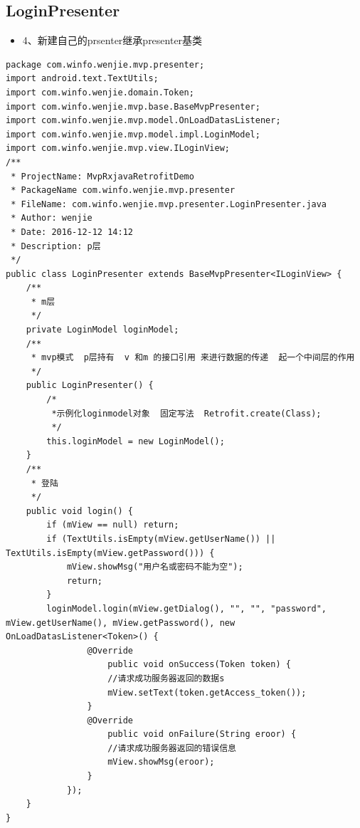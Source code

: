 \documentclass[9pt, b5paper]{article}
\begin{document}
\subsection{LoginPresenter}
\label{sec-21-4}
\begin{itemize}
\item 4、新建自己的prsenter继承presenter基类
\end{itemize}
\begin{verbatim}
package com.winfo.wenjie.mvp.presenter;
import android.text.TextUtils;
import com.winfo.wenjie.domain.Token;
import com.winfo.wenjie.mvp.base.BaseMvpPresenter;
import com.winfo.wenjie.mvp.model.OnLoadDatasListener;
import com.winfo.wenjie.mvp.model.impl.LoginModel;
import com.winfo.wenjie.mvp.view.ILoginView;
/**
 * ProjectName: MvpRxjavaRetrofitDemo
 * PackageName com.winfo.wenjie.mvp.presenter
 * FileName: com.winfo.wenjie.mvp.presenter.LoginPresenter.java
 * Author: wenjie
 * Date: 2016-12-12 14:12
 * Description: p层
 */
public class LoginPresenter extends BaseMvpPresenter<ILoginView> {
    /**
     * m层
     */
    private LoginModel loginModel;
    /**
     * mvp模式  p层持有  v 和m 的接口引用 来进行数据的传递  起一个中间层的作用
     */
    public LoginPresenter() {
        /*
         *示例化loginmodel对象  固定写法  Retrofit.create(Class);
         */
        this.loginModel = new LoginModel();
    }
    /**
     * 登陆
     */
    public void login() {
        if (mView == null) return;
        if (TextUtils.isEmpty(mView.getUserName()) || TextUtils.isEmpty(mView.getPassword())) {
            mView.showMsg("用户名或密码不能为空");
            return;
        }
        loginModel.login(mView.getDialog(), "", "", "password", mView.getUserName(), mView.getPassword(), new OnLoadDatasListener<Token>() {
                @Override
                    public void onSuccess(Token token) {
                    //请求成功服务器返回的数据s
                    mView.setText(token.getAccess_token());
                }
                @Override
                    public void onFailure(String eroor) {
                    //请求成功服务器返回的错误信息
                    mView.showMsg(eroor);
                }
            });
    }
}
\end{verbatim}
\end{document}
